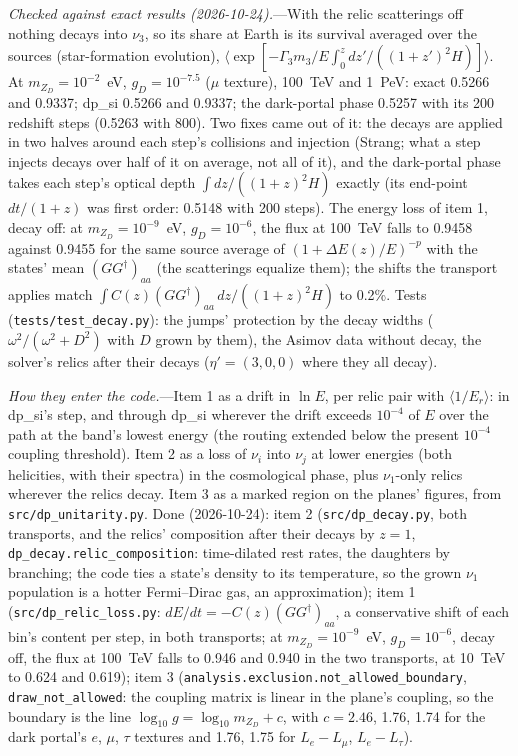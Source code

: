 \documentclass[11pt,a4paper]{article}
\newcommand{\file}[1]{\nolinkurl{#1}}
\newcommand{\mzd}{m_{Z_D}}
\newcommand{\gd}{g_D}
\begin{document}
\textit{Checked against exact results (2026-10-24).}---With the relic scatterings off nothing decays into $\nu_3$, so
its share at Earth is its survival averaged over the sources (star-formation evolution), $\langle\exp[-\Gamma_3 m_3/E
\int_0^{z}dz'/((1+z')^2H)]\rangle$. At $\mzd = 10^{-2}$~eV, $\gd = 10^{-7.5}$ ($\mu$ texture), 100~TeV and 1~PeV:
exact 0.5266 and 0.9337; dp\_si 0.5266 and 0.9337; the dark-portal phase 0.5257 with its 200 redshift steps (0.5263
with 800). Two fixes came out of it: the decays are applied in two halves around each step's collisions and injection
(Strang; what a step injects decays over half of it on average, not all of it), and the dark-portal phase takes each
step's optical depth $\int dz/((1+z)^2H)$ exactly (its end-point $dt/(1+z)$ was first order: 0.5148 with 200 steps).
The energy loss of item 1, decay off: at $\mzd = 10^{-9}$~eV, $\gd = 10^{-6}$, the flux at 100~TeV falls to 0.9458
against 0.9455 for the same source average of $(1 + \Delta E(z)/E)^{-p}$ with the states' mean $(GG^\dagger)_{aa}$
(the scatterings equalize them); the shifts the transport applies match $\int C(z)(GG^\dagger)_{aa}\,dz/((1+z)^2H)$ to
0.2\%. Tests (\file{tests/test\_decay.py}): the jumps' protection by the decay widths ($\omega^2/(\omega^2 + D^2)$ with
$D$ grown by them), the Asimov data without decay, the solver's relics after their decays ($\eta' = (3, 0, 0)$ where
they all decay).

\textit{How they enter the code.}---Item 1 as a drift in $\ln E$, per relic pair with $\langle 1/E_r\rangle$: in
dp\_si's step, and through dp\_si wherever the drift exceeds $10^{-4}$ of $E$ over the path at the band's lowest
energy (the routing extended below the present $10^{-4}$ coupling threshold). Item 2 as a loss of $\nu_i$ into
$\nu_j$ at lower energies (both helicities, with their spectra) in the cosmological phase, plus $\nu_1$-only relics
wherever the relics decay. Item 3 as a marked region on the planes' figures, from \file{src/dp\_unitarity.py}.
Done (2026-10-24): item 2 (\file{src/dp\_decay.py}, both transports, and the relics' composition after their decays by
$z = 1$, \texttt{dp\_decay.relic\_composition}: time-dilated rest rates, the daughters by branching; the code ties a
state's density to its temperature, so the grown $\nu_1$ population is a hotter Fermi--Dirac gas, an approximation);
item 1 (\file{src/dp\_relic\_loss.py}: $dE/dt = -C(z)(GG^\dagger)_{aa}$, a conservative shift of each bin's content per
step, in both transports; at $\mzd = 10^{-9}$~eV, $\gd = 10^{-6}$, decay off, the flux at 100~TeV falls to 0.946 and
0.940 in the two transports, at 10~TeV to 0.624 and 0.619); item 3 (\texttt{analysis.exclusion.not\_allowed\_boundary},
\texttt{draw\_not\_allowed}: the coupling matrix is linear in the plane's coupling, so the boundary is the line
$\log_{10} g = \log_{10}\mzd + c$, with $c = 2.46$, 1.76, 1.74 for the dark portal's $e$, $\mu$, $\tau$ textures and
1.76, 1.75 for $L_e - L_\mu$, $L_e - L_\tau$).
\end{document}
